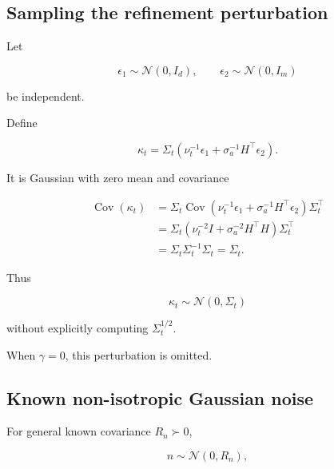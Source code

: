 \documentclass[11pt,a4paper]{article}
\newcommand{\Cov}{\operatorname{Cov}}
\newcommand{\Normal}{\mathcal{N}}
\newcommand{\sa}{\sigma_a}
\begin{document}
\subsection{Sampling the refinement perturbation}

Let

\begin{equation}
    \epsilon_1\sim\Normal(0,I_d),
    \qquad
    \epsilon_2\sim\Normal(0,I_m)
\end{equation}

be independent.

Define

\begin{equation}
    \kappa_t
    =
    \Sigma_t
    \left(
        \nu_t^{-1}\epsilon_1
        +
        \sa^{-1}H^\top\epsilon_2
    \right).
\end{equation}

It is Gaussian with zero mean and covariance

\begin{align}
    \Cov(\kappa_t)
    &=
    \Sigma_t
    \Cov(
        \nu_t^{-1}\epsilon_1
        +
        \sa^{-1}H^\top\epsilon_2
    )
    \Sigma_t^\top
    \\
    &=
    \Sigma_t
    (
        \nu_t^{-2}I
        +
        \sa^{-2}H^\top H
    )
    \Sigma_t^\top
    \\
    &=
    \Sigma_t
    \Sigma_t^{-1}
    \Sigma_t
    =
    \Sigma_t.
\end{align}

Thus

\begin{equation}
    \kappa_t\sim\Normal(0,\Sigma_t)
\end{equation}

without explicitly computing $\Sigma_t^{1/2}$.

When $\gamma=0$, this perturbation is omitted.



\subsection{Known non-isotropic Gaussian noise}

For general known covariance $R_n\succ0$,

\begin{equation}
    n\sim\Normal(0,R_n),
\end{equation}
\end{document}
